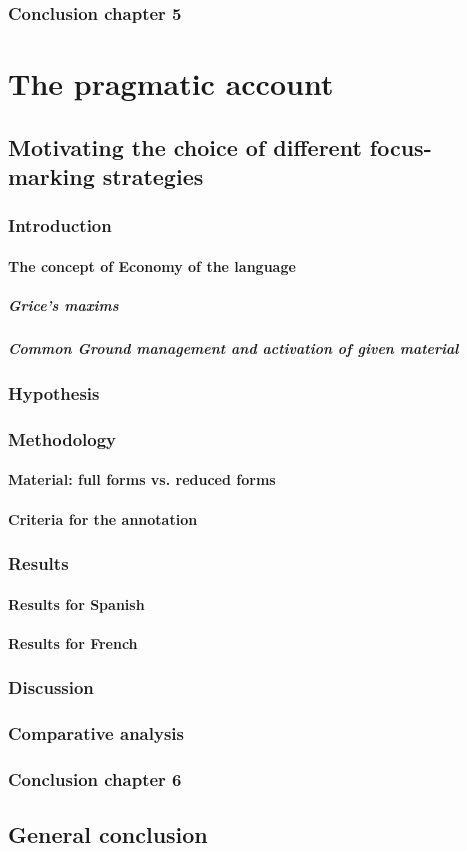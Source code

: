 \documentclass[12pt]{report}
\begin{document}
\section{Conclusion chapter 5}
\part{The pragmatic account}
\chapter{Motivating the choice of different focus-marking strategies}
\section{Introduction}
\subsection{The concept of Economy of the language}
\subsubsection{Grice’s maxims}
\subsubsection{Common Ground management and activation of given material}
\section{Hypothesis}
\section{Methodology}
\subsection{Material: full forms vs. reduced forms}
\subsection{Criteria for the annotation}
\section{Results}
\subsection{Results for Spanish}
\subsection{Results for French}
\section{Discussion}
\section{Comparative analysis}
\section{Conclusion chapter 6}
\chapter*{General conclusion} 
\end{document}
